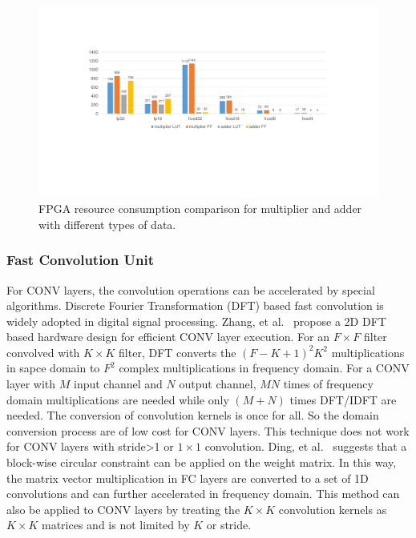 \begin{figure}[ht]
    \centering
    \includegraphics[width=1.0\columnwidth]{fig/mac_util.pdf}
    \caption{FPGA resource consumption comparison for multiplier and adder with different types of data.}
    \label{fig:mac_util}
\end{figure}

\subsubsection{Fast Convolution Unit}
For CONV layers, the convolution operations can be accelerated by special algorithms. Discrete Fourier Transformation (DFT) based fast convolution is widely adopted in digital signal processing. Zhang, et al.~\cite{zhang2017frequency} propose a 2D DFT based hardware design for efficient CONV layer execution. For an $F\times F$ filter convolved with $K\times K$ filter, DFT converts the $(F-K+1)^2K^2$ multiplications in sapce domain to $F^2$ complex multiplications in frequency domain. For a CONV layer with $M$ input channel and $N$ output channel, $MN$ times of frequency domain multiplications are needed while only $(M+N)$ times DFT/IDFT are needed. The conversion of convolution kernels is once for all. So the domain conversion process are of low cost for CONV layers. This technique does not work for CONV layers with stride>1 or $1\times 1$ convolution. Ding, et al.~\cite{ding2017c} suggests that a block-wise circular constraint can be applied on the weight matrix. In this way, the matrix vector multiplication in FC layers are converted to a set of 1D convolutions and can further accelerated in frequency domain. This method can also be applied to CONV layers by treating the $K\times K$ convolution kernels as $K\times K$ matrices and is not limited by $K$ or stride.

